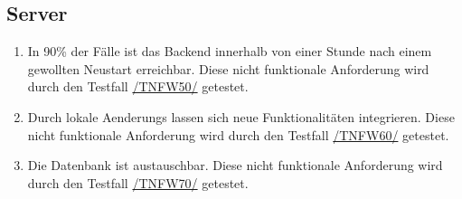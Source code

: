 \subsection*{Server}

\begin{samepage}
    \begin{enumerate}[label=\textbf{/NFW\arabic*0/}, align=left, start=5]
        \item \label{/NFW50/} In 90\% der Fälle ist das \Gls{Backend} innerhalb von einer Stunde nach einem gewollten Neustart erreichbar. Diese nicht funktionale Anforderung wird durch den Testfall \hyperref[/TNFW50/]{/TNFW50/} getestet.
        \item \label{/NFW60/} Durch \glspl{lokale Aenderung} lassen sich neue Funktionalitäten integrieren. Diese nicht funktionale Anforderung wird durch den Testfall \hyperref[/TNFW60/]{/TNFW60/} getestet.
        \item \label{/NFW70/} Die \Gls{Datenbank} ist austauschbar. Diese nicht funktionale Anforderung wird durch den Testfall \hyperref[/TNFW70/]{/TNFW70/} getestet.
    \end{enumerate}
\end{samepage}